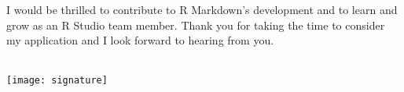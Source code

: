 \documentclass[10pt,letterpaper,sans]{moderncv}        %
\makeatletter
\renewcommand*{\makeletterclosing}{
  \@closing\\[3em]%
  \texttt{[image: signature]}\\%
  {\bfseries \@firstname~\@lastname}%
  \ifthenelse{\isundefined{\@enclosure}}{}{%
    \\%
    \vfill%
    {\color{color2}\itshape\enclname: \@enclosure}}}
\makeatother
\begin{document}
I would be thrilled to contribute  to R Markdown's development and to learn and
grow as an R Studio team member. Thank you for taking the time to consider my
application and I look forward to hearing from you.


\makeletterclosing

\end{document}
